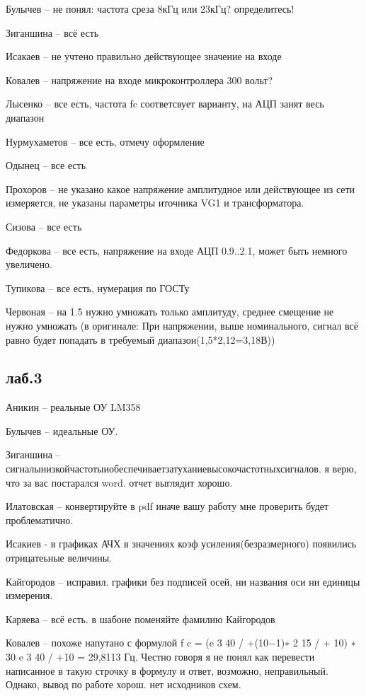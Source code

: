 \documentclass[a4paper,11pt]{article}
\begin{document}
Булычев -- не понял: частота среза 8кГц или 23кГц? определитесь!

Зиганшина -- всё есть

Исакаев -- не учтено правильно действующее значение на входе

Ковалев -- напряжение на входе микроконтроллера 300 вольт?

Лысенко -- все есть, частота fc соответсвует варианту, на АЦП занят весь диапазон

Нурмухаметов -- все есть, отмечу оформление

Одынец -- все есть

Прохоров -- не указано какое напряжение амплитудное или действующее из сети измеряется, не указаны параметры иточника VG1 и трансформатора.

Сизова -- все есть

Федоркова -- все есть, напряжение на входе АЦП 0.9..2.1, может быть немного увеличено.

Тупикова -- все есть, нумерация по ГОСТу

Червоная -- на 1.5 нужно умножать только амплитуду, среднее смещение не нужно умножать 
(в оригинале: При напряжении, выше номинального, сигнал всё равно будет попадать в требуемый диапазон(1,5*2,12=3,18В))

\newpage
\subsection*{лаб.3}
Аникин -- реальные ОУ LM358

Булычев -- идеальные ОУ.  

Зиганшина -- сигналынизкойчастотыиобеспечиваетзатуханиевысокочастотныхсигналов. я верю, что за вас постарался word.  отчет выглядит хорошо.

Илатовская -- конвертируйте в pdf иначе вашу работу мне проверить будет проблематично.

Исакиев - в графиках АЧХ в значениях коэф усиления(безразмерного) появились отрицатеьные величины.

Кайгородов -- исправил. графики без подписей осей, ни названия оси ни единицы измерения.

Каряева -- всё есть. в шабоне поменяйте фамилию Кайгородов

Ковалев -- похоже напутано с формулой f c = (e 3 40 / +(10−1)∗ 2 15 / + 10) ∗ 30 e 3 40 / +10 = 29,8113 Гц. Честно говоря я не понял как перевести написанное в такую строчку в формулу и ответ, 
возможно, неправильный.
           Однако, вывод по работе хорош. нет исходников схем.
\end{document}
